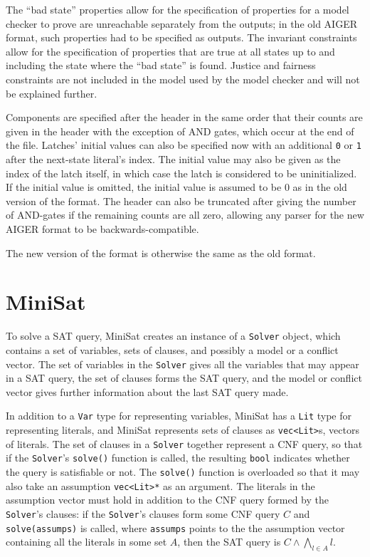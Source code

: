 \documentclass[12pt,a4paper,twoside,openright]{report}
\begin{document}
{{The ``bad state'' properties allow for the specification of properties for
a model checker to prove are unreachable separately from the outputs; in
the old AIGER format, such properties had to be specified as outputs.
The invariant constraints allow for the specification of properties that
are true at all states up to and including the state where the ``bad state''
is found.
Justice and fairness constraints are not included in the model used by
the model checker and will not be explained further.

Components are specified after the header in the same order that their
counts are given in the header with the exception of AND gates, which
occur at the end of the file. Latches' initial values can also be specified
now with an additional \verb,0, or \verb,1, after the next-state literal's
index. The initial value may also be given as the index of the latch itself,
in which case the latch is considered to be uninitialized.
If the initial value is omitted, the initial value is assumed to be
0 as in the old version of the format. The header can also be truncated
after giving the number of AND-gates if the remaining counts are all
zero, allowing any parser for the new AIGER format to be
backwards-compatible.

The new version of the format is otherwise
the same as the old format.}

\section{MiniSat}
\label{MiniSat}

To solve a SAT query, MiniSat creates an instance of a \verb,Solver, object,
which contains a set of variables, sets of clauses, and possibly a model or a conflict vector.
The set of variables in the \verb,Solver, gives all the variables that may appear in
a SAT query, the set of clauses forms the SAT query, and the model or conflict vector
gives further information about the last SAT query made.

In addition to a \verb,Var, type for representing variables, MiniSat has a \verb,Lit, type for
representing literals, and MiniSat represents sets of clauses as \verb,vec<Lit>,s,
vectors of literals. The set of clauses in a \verb,Solver, together represent a CNF query,
so that if the \verb,Solver,'s \verb,solve(), function is called,
the resulting \verb,bool, indicates whether the query is satisfiable or not. The
\verb,solve(), function is overloaded so that it may also take an assumption \verb,vec<Lit>*, as
an argument. The literals in the assumption vector must hold in addition to the CNF query formed
by the \verb,Solver,'s clauses: if the \verb,Solver,'s clauses form some CNF query $C$ and
\verb,solve(assumps), is called, where \verb,assumps, points to the the assumption vector
containing all the literals in some set $A$, then the SAT query is $C \wedge \bigwedge_{l \in A} l$.

}
\end{document}
